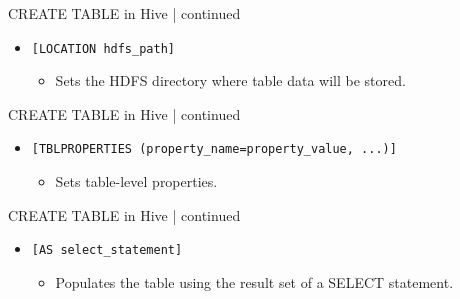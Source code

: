  \begin{frame}{CREATE TABLE in Hive | continued}
	\begin{tcolorbox}[colback=white,colframe=black,title= Part 5: Table Location]
		\small
		\begin{itemize}
			\item \texttt{[LOCATION hdfs\_path]}
			\begin{itemize}
				\item Sets the HDFS directory where table data will be stored.
			\end{itemize}
		\end{itemize}
	\end{tcolorbox}	
\end{frame}
  \begin{frame}{CREATE TABLE in Hive | continued}
	\begin{tcolorbox}[colback=white,colframe=black,title= Part 6: Table Properties]
		\small
	\begin{itemize}
	  \item \texttt{[TBLPROPERTIES (property\_name=property\_value, ...)]}
	  \begin{itemize}
		\item Sets table-level properties.
	  \end{itemize}
	\end{itemize}
	\end{tcolorbox}
  \end{frame}
  \begin{frame}{CREATE TABLE in Hive | continued}
	\begin{tcolorbox}[colback=white,colframe=black,title= Part 7: CTAS]
		\small
	\begin{itemize}
	  \item \texttt{[AS select\_statement]}
	  \begin{itemize}
		\item Populates the table using the result set of a SELECT statement.
	  \end{itemize}
	\end{itemize}
	\end{tcolorbox}
  \end{frame}
   

